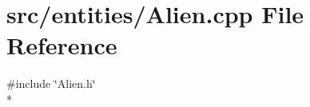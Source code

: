 \section{src/entities/\-Alien.cpp File Reference}
\label{_alien_8cpp}
{\ttfamily \#include \char`\"{}Alien.\-h\char`\"{}}\\*
